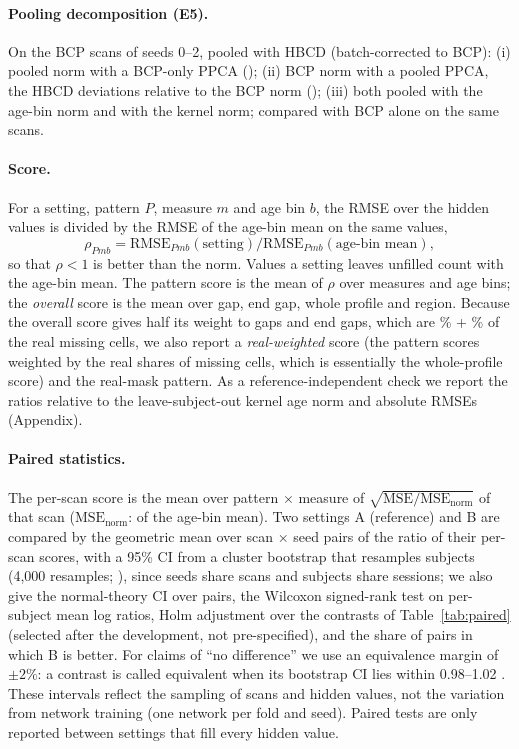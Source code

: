 \documentclass[11pt]{article}
\newcommand{\ratio}{\ensuremath{\rho}}
\begin{document}
\paragraph{Pooling decomposition (E5).} On the BCP scans of seeds 0--2, pooled with HBCD (batch-corrected to BCP):
(i) pooled norm with a BCP-only PPCA (); (ii) BCP norm with a pooled PPCA, the HBCD
deviations relative to the BCP norm (); (iii) both pooled with the age-bin norm and with
the kernel norm; compared with BCP alone on the same scans.

\paragraph{Score.} For a setting, pattern $P$, measure $m$ and age bin $b$, the RMSE over the hidden values is divided by
the RMSE of the age-bin mean on the same values,
\begin{equation}
\ratio_{Pmb}=\mathrm{RMSE}_{Pmb}(\text{setting})/\mathrm{RMSE}_{Pmb}(\text{age-bin mean}),
\end{equation}
so that $\ratio<1$ is better than the norm. Values a setting leaves unfilled count
with the age-bin mean. The pattern score is the mean of $\ratio$ over measures and age bins; the \emph{overall} score is
the mean over gap, end gap, whole profile and region. Because the overall score gives half its weight to gaps and end
gaps, which are \realShareEnd\% + \realShareGap\% of the real missing cells, we also report a \emph{real-weighted} score
(the pattern scores weighted by the real shares of missing cells, which is essentially the whole-profile score) and the
real-mask pattern. As a reference-independent check we report the ratios relative to the leave-subject-out kernel age
norm and absolute RMSEs (Appendix).

\paragraph{Paired statistics.} The per-scan score is the mean over pattern $\times$ measure of
$\sqrt{\mathrm{MSE}/\mathrm{MSE}_{\mathrm{norm}}}$ of that scan ($\mathrm{MSE}_{\mathrm{norm}}$: of the age-bin mean). Two settings A (reference) and B are compared by
the geometric mean over scan $\times$ seed pairs of the ratio of their per-scan scores, with a 95\% CI from a cluster
bootstrap that resamples subjects (4,000 resamples; \citealp{field2007bootstrap}), since seeds share scans and subjects
share sessions; we also give the normal-theory CI over pairs, the Wilcoxon signed-rank test \citep{wilcoxon1945} on
per-subject mean log ratios, Holm adjustment \citep{holm1979} over the \nContrasts{} contrasts of
Table~\ref{tab:paired} (selected after the development, not pre-specified), and the share of pairs in which B is better.
For claims of ``no difference'' we use an equivalence margin of $\pm2\%$: a contrast is called equivalent when its
bootstrap CI lies within 0.98--1.02 \citep{lakens2017equivalence}. These intervals reflect the sampling of scans and
hidden values, not the variation from network training (one network per fold and seed). Paired tests are only reported
between settings that fill every hidden value.
\end{document}

